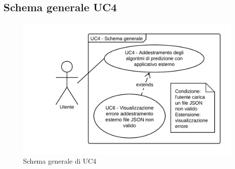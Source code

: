 \subsection{Schema generale UC4}
\begin{figure}[H]
\includegraphics{img/UC4_-_Schema_generale.png}
\caption{Schema generale di UC4}
\end{figure}
